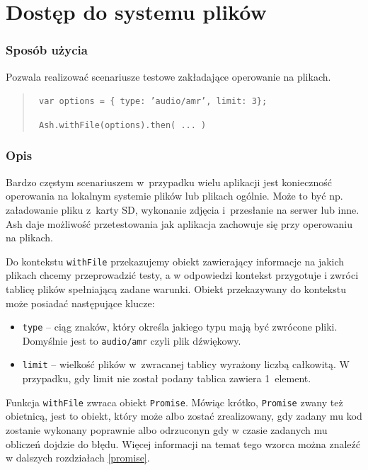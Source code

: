 \documentclass{xmgr}
\begin{document}
\section{Dostęp do systemu plików}

\subsubsection{Sposób użycia}
Pozwala realizować scenariusze testowe zakładające operowanie na plikach.

\begin{quote}
  \texttt{  var options = \{ type: 'audio/amr', limit: 3\};  }

  \texttt{  Ash.withFile(options).then( ... )  }
\end{quote}

\subsubsection{Opis}

Bardzo częstym scenariuszem w~przypadku wielu aplikacji jest konieczność operowania na lokalnym systemie plików lub plikach ogólnie. Może to być np. załadowanie pliku z~karty SD, wykonanie zdjęcia i~przesłanie na serwer lub inne. Ash daje możliwość przetestowania jak aplikacja zachowuje się przy operowaniu na plikach.  

Do kontekstu \texttt{withFile} przekazujemy obiekt zawierający informacje na jakich plikach chcemy przeprowadzić testy, a w odpowiedzi kontekst przygotuje i zwróci tablicę plików spełniającą zadane warunki. Obiekt przekazywany do kontekstu może posiadać następujące klucze:

\begin{itemize}
  \item \texttt{type} -- ciąg znaków, który określa jakiego typu mają być zwrócone pliki. Domyślnie jest to \texttt{audio/amr} czyli plik dźwiękowy. 
  \item \texttt{limit} -- wielkość plików w~zwracanej tablicy wyrażony liczbą całkowitą. W przypadku, gdy limit nie został podany tablica zawiera 1~element. 
\end{itemize}

Funkcja \texttt{withFile} zwraca obiekt \texttt{Promise}. Mówiąc krótko, \texttt{Promise} zwany też obietnicą, jest to obiekt, który może albo zostać zrealizowany, gdy zadany mu kod zostanie wykonany poprawnie albo odrzuconyn gdy w czasie zadanych mu obliczeń dojdzie do błędu. Więcej informacji na temat tego wzorca można znaleźć w dalszych rozdziałach \ref{promise}.
\end{document}
